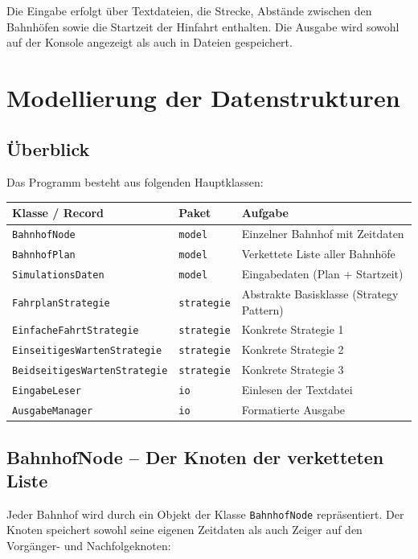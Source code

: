\documentclass[12pt,a4paper]{article}
\begin{document}
Die Eingabe erfolgt über Textdateien, die Strecke, Abstände zwischen den Bahnhöfen sowie die Startzeit der Hinfahrt enthalten. Die Ausgabe wird sowohl auf der Konsole angezeigt als auch in Dateien gespeichert.

\section{Modellierung der Datenstrukturen}

\subsection{Überblick}

Das Programm besteht aus folgenden Hauptklassen:

\begin{center}
\begin{tabular}{lll}
\toprule
\textbf{Klasse / Record} & \textbf{Paket} & \textbf{Aufgabe} \\
\midrule
\texttt{BahnhofNode} & \texttt{model} & Einzelner Bahnhof mit Zeitdaten \\
\texttt{BahnhofPlan} & \texttt{model} & Verkettete Liste aller Bahnhöfe \\
\texttt{SimulationsDaten} & \texttt{model} & Eingabedaten (Plan + Startzeit) \\
\texttt{FahrplanStrategie} & \texttt{strategie} & Abstrakte Basisklasse (Strategy Pattern) \\
\texttt{EinfacheFahrtStrategie} & \texttt{strategie} & Konkrete Strategie 1 \\
\texttt{EinseitigesWartenStrategie} & \texttt{strategie} & Konkrete Strategie 2 \\
\texttt{BeidseitigesWartenStrategie} & \texttt{strategie} & Konkrete Strategie 3 \\
\texttt{EingabeLeser} & \texttt{io} & Einlesen der Textdatei \\
\texttt{AusgabeManager} & \texttt{io} & Formatierte Ausgabe \\
\bottomrule
\end{tabular}
\end{center}

\subsection{BahnhofNode -- Der Knoten der verketteten Liste}

Jeder Bahnhof wird durch ein Objekt der Klasse \texttt{BahnhofNode} repräsentiert. Der Knoten speichert sowohl seine eigenen Zeitdaten als auch Zeiger auf den Vorgänger- und Nachfolgeknoten:
\end{document}
